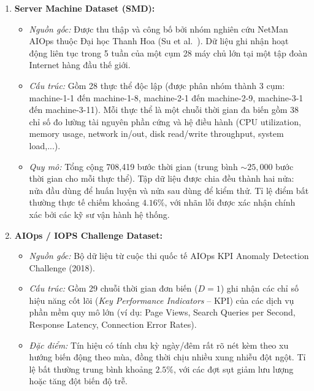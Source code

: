 \documentclass[11pt,journal,onecolumn]{IEEEtran}
\begin{document}
\begin{enumerate}
    \item \textbf{Server Machine Dataset (SMD):}
    \begin{itemize}
        \item \textit{Nguồn gốc:} Được thu thập và công bố bởi nhóm nghiên cứu NetMan AIOps thuộc Đại học Thanh Hoa (Su et al.~\cite{su2019robust}). Dữ liệu ghi nhận hoạt động liên tục trong 5 tuần của một cụm 28 máy chủ lớn tại một tập đoàn Internet hàng đầu thế giới.
        \item \textit{Cấu trúc:} Gồm 28 thực thể độc lập (được phân nhóm thành 3 cụm: machine-1-1 đến machine-1-8, machine-2-1 đến machine-2-9, machine-3-1 đến machine-3-11). Mỗi thực thể là một chuỗi thời gian đa biến gồm 38 chỉ số đo lường tài nguyên phần cứng và hệ điều hành (CPU utilization, memory usage, network in/out, disk read/write throughput, system load,...).
        \item \textit{Quy mô:} Tổng cộng 708,419 bước thời gian (trung bình $\sim 25,000$ bước thời gian cho mỗi thực thể). Tập dữ liệu được chia đều thành hai nửa: nửa đầu dùng để huấn luyện và nửa sau dùng để kiểm thử. Tỉ lệ điểm bất thường thực tế chiếm khoảng $4.16\%$, với nhãn lỗi được xác nhận chính xác bởi các kỹ sư vận hành hệ thống.
    \end{itemize}
    
    \item \textbf{AIOps / IOPS Challenge Dataset:}
    \begin{itemize}
        \item \textit{Nguồn gốc:} Bộ dữ liệu từ cuộc thi quốc tế AIOps KPI Anomaly Detection Challenge (2018).
        \item \textit{Cấu trúc:} Gồm 29 chuỗi thời gian đơn biến ($D = 1$) ghi nhận các chỉ số hiệu năng cốt lõi (\textit{Key Performance Indicators} -- KPI) của các dịch vụ phần mềm quy mô lớn (ví dụ: Page Views, Search Queries per Second, Response Latency, Connection Error Rates).
        \item \textit{Đặc điểm:} Tín hiệu có tính chu kỳ ngày/đêm rất rõ nét kèm theo xu hướng biến động theo mùa, đồng thời chịu nhiều xung nhiễu đột ngột. Tỉ lệ bất thường trung bình khoảng $2.5\%$, với các đợt sụt giảm lưu lượng hoặc tăng đột biến độ trễ.
    \end{itemize}
    

\end{enumerate}
\end{document}
